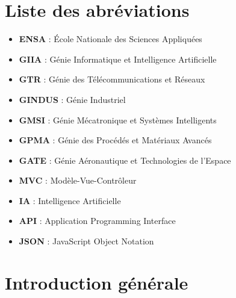 \documentclass[a4paper,12pt]{article}
\begin{document}
\newpage
{}
\section*{\Huge{Liste des abréviations}}
\vspace{1cm}
\begin{itemize}[label=\textbullet, font=\large\bfseries, itemsep=0.5cm]
    \item \textbf{ENSA} : École Nationale des Sciences Appliquées
    \item \textbf{GIIA} : Génie Informatique et Intelligence Artificielle
    \item \textbf{GTR} : Génie des Télécommunications et Réseaux
    \item \textbf{GINDUS} : Génie Industriel
    \item \textbf{GMSI} : Génie Mécatronique et Systèmes Intelligents
    \item \textbf{GPMA} : Génie des Procédés et Matériaux Avancés
    \item \textbf{GATE} : Génie Aéronautique et Technologies de l'Espace
    \item \textbf{MVC} : Modèle-Vue-Contrôleur
    \item \textbf{IA} : Intelligence Artificielle
    \item \textbf{API} : Application Programming Interface
    \item \textbf{JSON} : JavaScript Object Notation
\end{itemize}

\newpage
{}
\renewcommand{\listfigurename}{Liste des figures}
\listoffigures

\newpage
{}
\renewcommand{\listtablename}{Liste des tableaux}
\listoftables

\newpage
{}
\renewcommand{\contentsname}{Table des matières}
\tableofcontents
\newpage
\clearpage
\hypersetup{pageanchor=true}
\clearpage
\section{Introduction générale}
\end{document}
